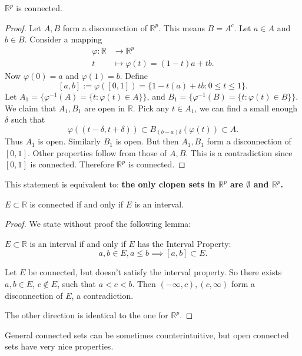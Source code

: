 \begin{corollary}
	\label{thm: Rp-connected}
	$\mathbb{R}^p$ is connected.
\end{corollary}
\begin{proof}
	Let $A, B$ form a disconnection of $\mathbb{R}^p$. This means $B = A^c$. Let $a \in A$ and $b \in B$. Consider a mapping 
	\begin{align*}
		\varphi: \mathbb{R} &\longrightarrow \mathbb{R}^p \\
		t &\longmapsto \varphi(t) = (1-t)a + tb
	.\end{align*}
	Now $\varphi(0) = a$ and $\varphi(1) = b$. Define
	\[
		[a,b] := \varphi([0,1]) = \{1-t(a) + tb: 0\le t\le 1\} 
	.\] 
	Let $A_1 = \{\varphi^{-1}(A) = \{t: \varphi(t) \in A\} \} $, and 
	$B_1 = \{\varphi^{-1}(B) = \{t: \varphi(t) \in B\} \} $. 
	We claim that $A_1, B_1$ are open in $\mathbb{R}$. Pick any $t \in A_1$, we can find a small enough $\delta$ such that 
	\[
		\varphi((t-\delta, t+\delta)) \subset 
		B_{(b - a)\delta}(\varphi(t))
		\subset A
	.\] 
	Thus $A_1$ is open. Similarly $B_1$ is open. But then $A_1, B_1 $ form a disconnection of $[0,1]$. Other properties follow from those of  $A, B$. This is a contradiction since $[0,1]$ is connected. Therefore $\mathbb{R}^p$ is connected.
\end{proof}

\begin{remark}
	This statement is equivalent to: \textbf{the only clopen sets in $\mathbb{R}^p$ are $\emptyset $ and $\mathbb{R}^p$.}
\end{remark}

\begin{theorem}
	$E \subset \mathbb{R}$ is connected if and only if $E$ is an interval.
\end{theorem}
\begin{proof}
	We state without proof the following lemma:
\begin{lemma}
	$E \subset \mathbb{R}$ is an interval if and only if $E$ has the Interval Property:  \[
		a, b \in E, a\le b \implies [a,b] \subset E
	.\] 
\end{lemma}	
Let $E$ be connected, but doesn't satisfy the interval property. So there exists $a,b \in E$, $c \not\in E$, such that $a < c < b$. Then $(-\infty , c), (c, \infty )$ form a disconnection of $E$, a contradiction.

The other direction is identical to the one for $\mathbb{R}^p$.
\end{proof}
\begin{remark}
	General connected sets can be sometimes counterintuitive, but open connected sets have very nice properties.
\end{remark}


